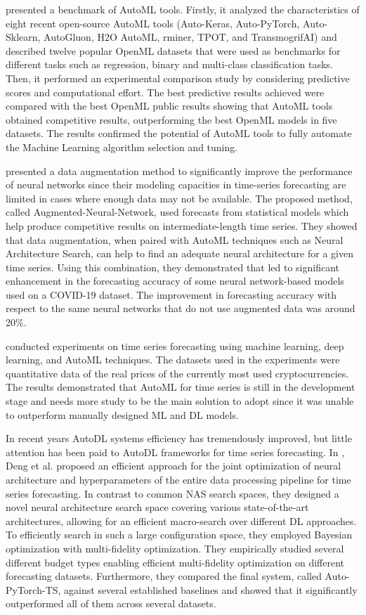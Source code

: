 \cite{9534091} presented a benchmark of AutoML tools.
Firstly, it analyzed the characteristics of eight recent open-source AutoML tools (Auto-Keras, Auto-PyTorch, Auto-Sklearn, AutoGluon, H2O AutoML, rminer, TPOT, and TransmogrifAI) and described twelve popular OpenML datasets that were used as benchmarks for different tasks such as regression, binary and multi-class classification tasks.
Then, it performed an experimental comparison study by considering predictive scores and computational effort.
The best predictive results achieved were compared with the best OpenML public results showing that AutoML tools obtained competitive results, outperforming the best OpenML models in five datasets.
The results confirmed the potential of AutoML tools to fully automate the Machine Learning algorithm selection and tuning.

\cite{9564380} presented a data augmentation method to significantly improve the performance of neural networks since their modeling capacities in time-series forecasting are limited in cases where enough data may not be available.
The proposed method, called Augmented-Neural-Network, used forecasts from statistical models which help produce competitive results on intermediate-length time series.
They showed that data augmentation, when paired with AutoML techniques such as Neural Architecture Search, can help to find an adequate neural architecture for a given time series.
Using this combination, they demonstrated that led to significant enhancement in the forecasting accuracy of some neural network-based models used on a COVID-19 dataset.
The improvement in forecasting accuracy with respect to the same neural networks that do not use augmented data was around 20\%.

\cite{su142215292} conducted experiments on time series forecasting using machine learning, deep learning, and AutoML techniques.
The datasets used in the experiments were quantitative data of the real prices of the currently most used cryptocurrencies.
The results demonstrated that AutoML for time series is still in the development stage and needs more study to be the main solution to adopt since it was unable to outperform manually designed ML and DL models.

In recent years AutoDL systems efficiency has tremendously improved, but little attention has been paid to AutoDL frameworks for time series forecasting.
In \cite{Deng2022}, Deng et al. proposed an efficient approach for the joint optimization of neural architecture and hyperparameters of the entire data processing pipeline for time series forecasting.
In contrast to common NAS search spaces, they designed a novel neural architecture search space covering various state-of-the-art architectures, allowing for an efficient macro-search over different DL approaches.
To efficiently search in such a large configuration space, they employed Bayesian optimization with multi-fidelity optimization.
They empirically studied several different budget types enabling efficient multi-fidelity optimization on different forecasting datasets.
Furthermore, they compared the final system, called Auto-PyTorch-TS, against several established baselines and showed that it significantly outperformed all of them across several datasets.


